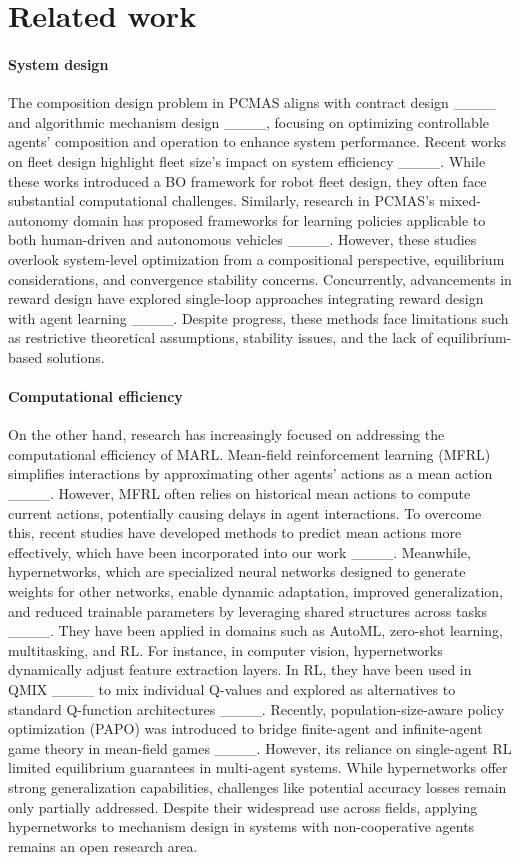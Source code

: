 \section{Related work}
\paragraph{System design} 

The composition design problem in PCMAS aligns with contract design ____ and algorithmic mechanism design ____, focusing on optimizing controllable agents' composition and operation to enhance system performance. Recent works on fleet design highlight fleet size's impact on system efficiency ____. While these works introduced a BO framework for robot fleet design, they often face substantial computational challenges. Similarly, research in PCMAS's mixed-autonomy domain has proposed frameworks for learning policies applicable to both human-driven and autonomous vehicles ____. However, these studies overlook system-level optimization from a compositional perspective, equilibrium considerations, and convergence stability concerns. Concurrently, advancements in reward design have explored single-loop approaches integrating reward design with agent learning ____. Despite progress, these methods face limitations such as restrictive theoretical assumptions, stability issues, and the lack of equilibrium-based solutions.

\paragraph{Computational efficiency}

On the other hand, research has increasingly focused on addressing the computational efficiency of MARL. Mean-field reinforcement learning (MFRL) simplifies interactions by approximating other agents' actions as a mean action ____. However, MFRL often relies on historical mean actions to compute current actions, potentially causing delays in agent interactions. To overcome this, recent studies have developed methods to predict mean actions more effectively, which have been incorporated into our work ____. Meanwhile, hypernetworks, which are specialized neural networks designed to generate weights for other networks, enable dynamic adaptation, improved generalization, and reduced trainable parameters by leveraging shared structures across tasks ____. They have been applied in domains such as AutoML, zero-shot learning, multitasking, and RL. For instance, in computer vision, hypernetworks dynamically adjust feature extraction layers. In RL, they have been used in QMIX ____ to mix individual Q-values and explored as alternatives to standard Q-function architectures ____. Recently, population-size-aware policy optimization (PAPO) was introduced to bridge finite-agent and infinite-agent game theory in mean-field games ____. However, its reliance on single-agent RL limited equilibrium guarantees in multi-agent systems. While hypernetworks offer strong generalization capabilities, challenges like potential accuracy losses remain only partially addressed. Despite their widespread use across fields, applying hypernetworks to mechanism design in systems with non-cooperative agents remains an open research area.